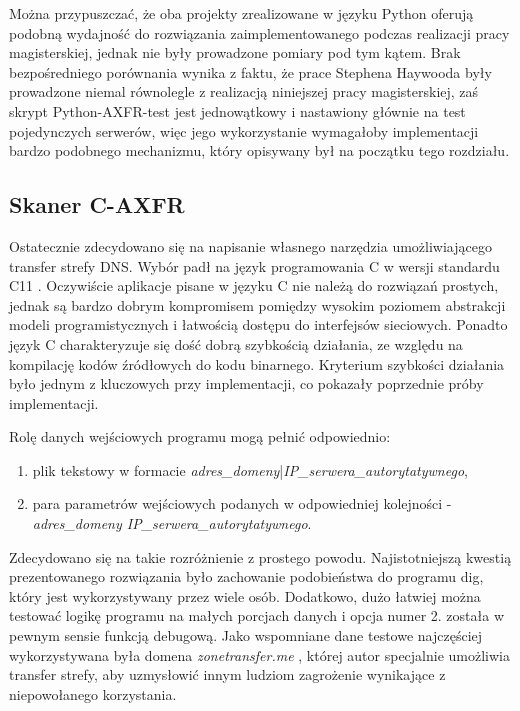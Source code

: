 Można przypuszczać, że oba projekty zrealizowane w języku Python \cite{python_axfr_test, asg-axfr} oferują podobną wydajność do
rozwiązania zaimplementowanego podczas realizacji pracy magisterskiej, jednak nie były prowadzone pomiary pod tym kątem. Brak
bezpośredniego porównania wynika z faktu, że prace Stephena Haywooda \cite{asg-axfr} były prowadzone niemal równolegle z realizacją
niniejszej pracy magisterskiej, zaś skrypt Python-AXFR-test \cite{python_axfr_test} jest jednowątkowy i nastawiony głównie na test
pojedynczych serwerów, więc jego wykorzystanie wymagałoby implementacji bardzo podobnego mechanizmu, który opisywany był na
początku tego rozdziału.

\subsection{Skaner C-AXFR}
Ostatecznie zdecydowano się na napisanie własnego narzędzia umożliwiającego transfer strefy DNS. Wybór padł na język
programowania C \cite{Kernighan:1988:CPL:576122} w wersji standardu C11 \cite{ISO9899}. Oczywiście aplikacje pisane w języku
C nie należą do rozwiązań prostych, jednak są bardzo dobrym kompromisem pomiędzy wysokim poziomem abstrakcji modeli programistycznych
i łatwością dostępu do interfejsów sieciowych. Ponadto język C charakteryzuje się dość dobrą szybkością działania, ze względu na
kompilację kodów źródłowych do kodu binarnego. Kryterium szybkości działania było jednym z kluczowych przy implementacji, co
pokazały poprzednie próby implementacji.

Rolę danych wejściowych programu mogą pełnić odpowiednio:
\begin{enumerate}
	\item plik tekstowy w formacie \textit{adres\_domeny}|\textit{IP\_serwera\_autorytatywnego},
	\item para parametrów wejściowych podanych w odpowiedniej kolejności - \textit{adres\_domeny IP\_serwera\_autorytatywnego}.
\end{enumerate}
Zdecydowano się na takie rozróżnienie z prostego powodu. Najistotniejszą kwestią prezentowanego rozwiązania było
zachowanie podobieństwa do programu dig, który jest wykorzystywany przez wiele osób. Dodatkowo, dużo łatwiej można testować
logikę programu na małych
porcjach danych i opcja numer 2. została w pewnym sensie funkcją debugową. Jako wspomniane dane testowe najczęściej wykorzystywana
była domena \textit{zonetransfer.me} \cite{zonetransfer}, której autor specjalnie umożliwia transfer strefy, aby uzmysłowić innym
ludziom zagrożenie wynikające z niepowołanego korzystania.


